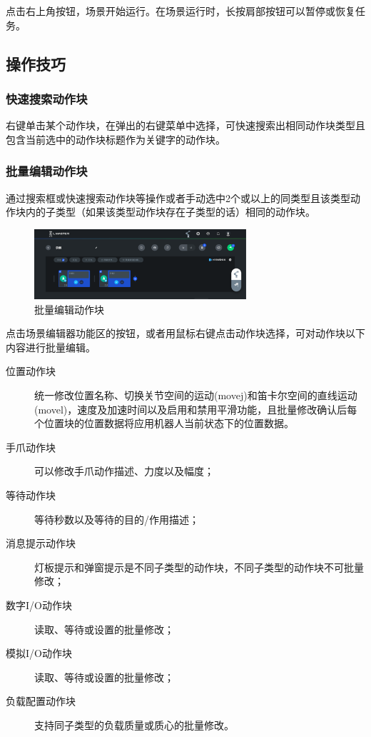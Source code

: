 点击右上角按钮，场景开始运行。在场景运行时，长按肩部按钮可以暂停或恢复任务。



\subsection{操作技巧}
\subsubsection{快速搜索动作块}
右键单击某个动作块，在弹出的右键菜单中选择，可快速搜索出相同动作块类型且包含当前选中的动作块标题作为关键字的动作块。
\subsubsection{批量编辑动作块}
\def\ttt{通过搜索框或快速搜索动作块等操作或者手动选中}
\ttt 2个或以上的同类型且该类型动作块内的子类型（如果该类型动作块存在子类型的话）相同的动作块。

\begin{figure}[hb]
	\centering
	\includegraphics[height=2.6cm]{shots/batch_edit.pdf}
	\caption{批量编辑动作块}
	\label{fig:批量编辑动作块}
\end{figure}

点击场景编辑器功能区的按钮，或者用鼠标右键点击动作块选择，可对动作块以下内容进行批量编辑。

\begin{description}
\item [位置动作块] 统一修改位置名称、切换关节空间的运动(movej)和笛卡尔空间的直线运动(movel)，速度及加速时间以及启用和禁用平滑功能，且批量修改确认后每个位置块的位置数据将应用机器人当前状态下的位置数据。
\item [手爪动作块] 可以修改手爪动作描述、力度以及幅度；
\item [等待动作块] 等待秒数以及等待的目的/作用描述；
\item [消息提示动作块] 灯板提示和弹窗提示是不同子类型的动作块，不同子类型的动作块不可批量修改；
\item [数字I/O动作块] 读取、等待或设置的批量修改；
\item [模拟I/O动作块] 读取、等待或设置的批量修改；
\item [负载配置动作块] 支持同子类型的负载质量或质心的批量修改。
\end{description}

